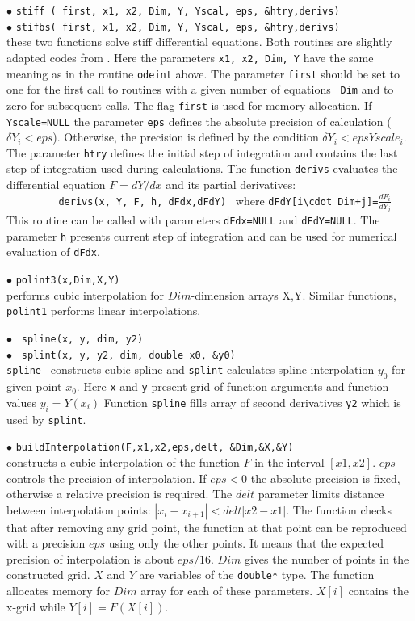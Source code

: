 \documentclass[12pt,a4paper]{article}
\begin{document}
\noindent$\bullet$ \verb|stiff ( first, x1, x2, Dim, Y, Yscal, eps, &htry,derivs)|\\
\noindent$\bullet$ \verb|stifbs( first, x1, x2, Dim, Y, Yscal, eps, &htry,derivs)|\\
these two functions solve  stiff  differential
equations. Both routines  are slightly adapted codes from
\cite{Numerical}. Here the parameters  {\tt x1, x2, Dim, Y} have the same
meaning as in the routine  {\tt odeint}  above. The parameter {\tt first}
should be set to one for the first call to routines with a given number of equations {\tt
Dim} and to zero for subsequent calls.  The flag {\tt first} is used for memory allocation.  If {\tt Yscale=NULL}  the parameter
{\tt eps} defines the absolute precision of calculation ($\delta Y_i < eps$).  Otherwise, the
precision is defined by the  condition $\delta Y_i < eps Yscale_i$. 
The parameter {\tt htry} defines the initial step of integration and contains the last step of
integration used during  calculations.
The function {\tt derivs} evaluates the differential equation
$F= dY/dx$  and its partial derivatives:\\  
\verb|         derivs(x, Y, F, h, dFdx,dFdY) | where
\verb|dFdY[i\cdot Dim+j]=|$\frac{dF_i}{dY_j}$\\
This routine can
be called with parameters {\tt dFdx=NULL} and  {\tt dFdY=NULL}. The  parameter
{\tt h} presents current step of integration and can be used for numerical
evaluation of  {\tt dFdx}. 


\noindent$\bullet$ \verb|polint3(x,Dim,X,Y)|\\
performs   cubic interpolation for $Dim$-dimension arrays X,Y. Similar 
functions, \verb|polint1|  performs linear interpolations.

\noindent$\bullet$ \verb| spline(x, y, dim, y2)|\\
\noindent$\bullet$ \verb| splint(x, y, y2, dim, double x0, &y0)|\\
{\tt spline } constructs cubic  spline and {\tt splint} calculates spline
interpolation $y_0$  for given point $x_0$. Here  {\tt x} and {\tt y}
present grid of function arguments and function values $ y_i= Y(x_i)$
Function {\tt spline} fills   array of second  derivatives {\tt y2} which is 
used by  {\tt splint}.
   

\noindent$\bullet$ \verb|buildInterpolation(F,x1,x2,eps,delt, &Dim,&X,&Y)|\\
constructs  a cubic interpolation of the function $F$ in the interval $[x1,x2]$.
$eps$ controls the precision of interpolation. If $eps < 0$ the absolute 
precision is fixed, otherwise a relative precision is required.
The $delt$ parameter limits distance between  interpolation points: $|x_i
-x_{i+1}|<delt|x2-x1|$.  
The function checks that after removing any grid point, the function at that point
can be reproduced with a precision $eps$ using only the other points.  It means that
the expected precision of interpolation is about $eps/16$. $Dim$ gives the number 
of points in the  constructed grid. $X$ and $Y$ are variables of the  
\verb|double*| type. The function allocates memory for $Dim$ array for each 
 of these parameters. $X[i]$ contains the x-grid while $Y[i]=F(X[i])$.
\end{document}
